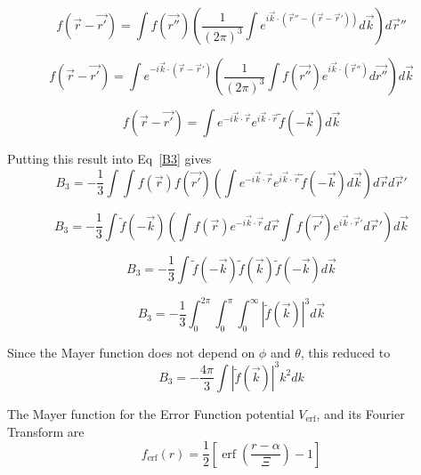 \documentclass[double,12pt]{beavtex}
\begin{document}
\begin{equation}f(\vec{r}-\vec{r'})=\int{f(\vec{r''})\left( \frac{1}{\left(2\pi\right)^3}\int e^{i\vec k\cdot (\vec{r}''-(\vec r-\vec r'))}d\vec{k} \right) d\vec r''} \end{equation}

\begin{equation}f(\vec{r}-\vec{r'})=\int{ e^{-i\vec k\cdot (\vec r-\vec r')}\left(\frac{1}{\left(2\pi\right)^3}\int{f(\vec{r''}) e^{i\vec k\cdot (\vec{r}'')}d\vec{r''}} \right) d\vec k} \end{equation}

\begin{equation}f(\vec{r}-\vec{r'})=\int{ e^{-i\vec k\cdot \vec r}e^{i\vec k\cdot \vec r}\widetilde{f}(-\vec k) d\vec k} \end{equation}

Putting this result into Eq~\ref{B3} gives
\begin{equation}B_3=-\frac{1}{3}\int{\int{f(\vec{r})f(\vec{r'})\left(\int{ e^{-i\vec k\cdot \vec r}e^{i\vec k\cdot \vec r}\widetilde{f}(-\vec k) d\vec k}\right)d\vec rd\vec r'}}\end{equation}

\begin{equation}B_3=-\frac{1}{3}\int{\widetilde{f}(-\vec k)\left(\int{f(\vec{r})e^{-i\vec k\cdot \vec r}}d\vec r\int{f(\vec{r'})e^{i\vec k\cdot \vec r'} d\vec r'}\right)d\vec k}\end{equation}

\begin{equation}B_3=-\frac{1}{3}\int{\widetilde{f}(-\vec k)\widetilde{f}(\vec k)\widetilde{f}(-\vec k)d\vec k}\end{equation}

\begin{equation}B_3=-\frac{1}{3}\int_0^{2\pi}\int_0^{\pi}\int_0^{\infty}{|\widetilde{f}(\vec k)|^3d\vec k}\end{equation}

Since the Mayer function does not depend on $\phi$ and $\theta$, this reduced to
\begin{equation}B_3=-\frac{4\pi}{3}\int{|\widetilde{f}(\vec k)|^3k^2dk}\end{equation}

The Mayer function for the Error Function potential $V_{\operatorname{erf}}$, 
and its Fourier Transform are
\begin{equation}f_{\operatorname{erf}}(r)=\frac{1}{2}\left[\operatorname{erf}\left(\frac{r-\alpha}{\Xi}\right)-1\right]\end{equation} 
\end{document}
